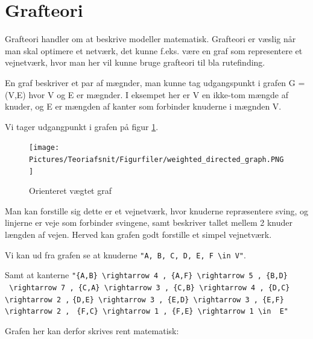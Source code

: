 \section{Grafteori}

Grafteori handler om at beskrive  modeller matematisk. Grafteori er væslig når man skal optimere et netværk, det kunne f.eks. være en graf som representere et vejnetværk, hvor man her vil kunne bruge grafteori til bla rutefinding.  

En graf beskriver et par af mægnder, man kunne tag udgangspunkt i grafen G = (V,E) hvor V og E er mægnder. I eksempet her er V en ikke-tom mængde af knuder, og E er mængden af kanter som forbinder knuderne i mægnden V. 

\vspace{5mm}

Vi tager udgangpunkt i grafen på figur \ref{fig:weighted-directed-graph}.

\begin{figure}[H]
\begin{adjustbox}{width=0.5\textwidth,center=\textwidth}
\centering
\texttt{[image: Pictures/Teoriafsnit/Figurfiler/weighted\_directed\_graph.PNG]}
\end{adjustbox}
\caption{Orienteret vægtet graf}
\label{fig:weighted-directed-graph}
\end{figure}

\vspace{5mm}

Man kan forstille sig dette er et vejnetværk, hvor knuderne repræsentere sving, og linjerne er veje som forbinder svingene, samt beskriver tallet mellem 2 knuder længden af vejen. Herved kan grafen godt forstille et simpel vejnetværk.

\vspace{5mm}

Vi kan ud fra grafen se at knuderne \verb!"A, B, C, D, E, F \in V"!. 

\vspace{5mm}

Samt at kanterne \verb!"{A,B} \rightarrow 4 , {A,F} \rightarrow 5 , {B,D}! \\
\verb! \rightarrow 7 , {C,A} \rightarrow 3 , {C,B} \rightarrow 4 , {D,C} \rightarrow 2 ,!
\verb!{D,E} \rightarrow 3 , {E,D} \rightarrow 3 , {E,F} \rightarrow 2 , !
\verb!{F,C} \rightarrow 1 , {F,E} \rightarrow 1 \in  E"!

\vspace{5mm}

Grafen her kan derfor skrives rent matematisk:

